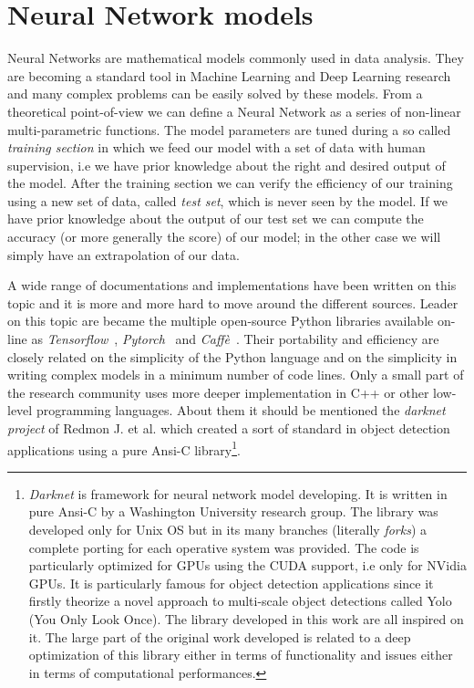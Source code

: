 \documentclass{standalone}
\begin{document}
\section[Neural Network models]{Neural Network models}\label{NN:nn}

Neural Networks are mathematical models commonly used in data analysis.
They are becoming a standard tool in Machine Learning and Deep Learning research and many complex problems can be easily solved by these models.
From a theoretical point-of-view we can define a Neural Network as a series of non-linear multi-parametric functions.
The model parameters are tuned during a so called \emph{training section} in which we feed our model with a set of data with human supervision, i.e we have prior knowledge about the right and desired output of the model.
After the training section we can verify the efficiency of our training using a new set of data, called \emph{test set}, which is never seen by the model.
If we have prior knowledge about the output of our test set we can compute the accuracy (or more generally the score) of our model; in the other case we will simply have an extrapolation of our data.

A wide range of documentations and implementations have been written on this topic and it is more and more hard to move around the different sources.
Leader on this topic are became the multiple open-source Python libraries available on-line as \emph{Tensorflow}~\cite{tensorflow2015-whitepaper}, \emph{Pytorch}~\cite{paszke2017automatic} and \emph{Caffè}~\cite{Jia:2014:Caffe}.
Their portability and efficiency are closely related on the simplicity of the Python language and on the simplicity in writing complex models in a minimum number of code lines.
Only a small part of the research community uses more deeper implementation in C++ or other low-level programming languages.
About them it should be mentioned the \emph{darknet project} of Redmon J. et al. which created a sort of standard in object detection applications using a pure Ansi-C library\footnote{
  \emph{Darknet} is framework for neural network model developing.
  It is written in pure Ansi-C by a Washington University research group.
  The library was developed only for Unix OS but in its many branches (literally \emph{forks}) a complete porting for each operative system was provided.
  The code is particularly optimized for GPUs using the CUDA support, i.e only for NVidia GPUs.
  It is particularly famous for object detection applications since it firstly theorize a novel approach to multi-scale object detections called Yolo (You Only Look Once).
  The library developed in this work are all inspired on it.
  The large part of the original work developed is related to a deep optimization of this library either in terms of functionality and issues either in terms of computational performances.
}.
\end{document}
